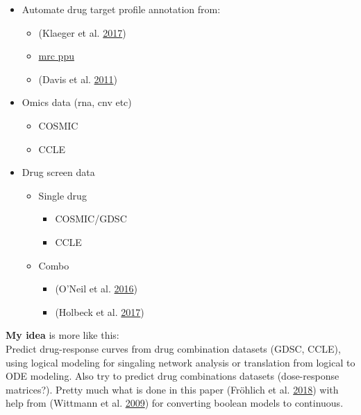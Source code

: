 \documentclass[
  12pt,
]{book}
\providecommand{\tightlist}{%
  \setlength{\itemsep}{0pt}\setlength{\parskip}{0pt}}
\begin{document}
\begin{itemize}
\tightlist
\item
  Automate drug target profile annotation from:

  \begin{itemize}
  \tightlist
  \item
    (Klaeger et al. \protect\hyperlink{ref-Klaeger2017}{2017})
  \item
    \href{http://www.kinase-screen.mrc.ac.uk/}{mrc ppu}
  \item
    (Davis et al. \protect\hyperlink{ref-Davis2011}{2011})
  \end{itemize}
\item
  Omics data (rna, cnv etc)

  \begin{itemize}
  \tightlist
  \item
    COSMIC
  \item
    CCLE
  \end{itemize}
\item
  Drug screen data

  \begin{itemize}
  \tightlist
  \item
    Single drug

    \begin{itemize}
    \tightlist
    \item
      COSMIC/GDSC
    \item
      CCLE
    \end{itemize}
  \item
    Combo

    \begin{itemize}
    \tightlist
    \item
      (O'Neil et al. \protect\hyperlink{ref-ONeil2016}{2016})
    \item
      (Holbeck et al. \protect\hyperlink{ref-Holbeck2017}{2017})
    \end{itemize}
  \end{itemize}
\end{itemize}

\textbf{My idea} is more like this:\\
Predict drug-response curves from drug combination datasets (GDSC, CCLE),
using logical modeling for singaling network analysis or translation from
logical to ODE modeling. Also try to predict drug combinations datasets
(dose-response matrices?). Pretty much what is done in this paper (Fröhlich et al. \protect\hyperlink{ref-Frohlich2018}{2018})
with help from (Wittmann et al. \protect\hyperlink{ref-Wittmann2009}{2009}) for converting boolean models to continuous.
\end{document}
